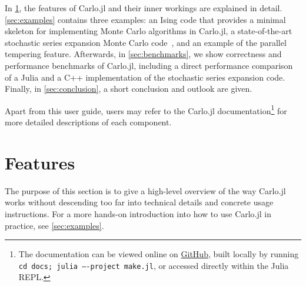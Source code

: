\documentclass{SciPost}
\begin{document}
In \cref{sec:features}, the features of Carlo.jl and their inner workings are explained in detail. \cref{sec:examples} contains three examples: an Ising code that provides a minimal skeleton for implementing Monte Carlo algorithms in Carlo.jl, a state-of-the-art stochastic series expansion Monte Carlo code~\cite{Sandvik1999}, and an example of the parallel tempering feature. Afterwards, in \cref{sec:benchmarks}, we show correctness and performance benchmarks of Carlo.jl, including a direct performance comparison of a Julia and a C++ implementation of the stochastic series expansion code. Finally, in \cref{sec:conclusion}, a short conclusion and outlook are given.

Apart from this user guide, users may refer to the Carlo.jl documentation\footnote{The documentation can be viewed online on \href{https://github.com/lukas-weber/Carlo.jl.git}{GitHub}, built locally by running  \texttt{cd docs; julia ----project make.jl}, or accessed directly within the Julia REPL.} for more detailed descriptions of each component.

\section{Features}
\label{sec:features}
The purpose of this section is to give a high-level overview of the way Carlo.jl works without descending too far into technical details and concrete usage instructions. For a more hands-on introduction into how to use Carlo.jl in practice, see \cref{sec:examples}.
\end{document}
